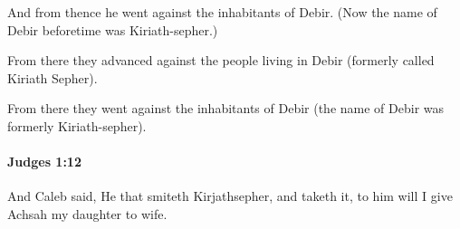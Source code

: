 			\begin{versebox}
					\item[BHS] 
					\item[ASV] And from thence he went against the inhabitants of Debir. (Now the name of Debir beforetime was Kiriath-sepher.)
					\item[NIV] From there they advanced against the people living in Debir (formerly called Kiriath Sepher).
					\item[NRSV] From there they went against the inhabitants of Debir (the name of Debir was formerly Kiriath-sepher).
			\end{versebox}

		\paragraph{Judges 1:12} %
			\label{JUDGES-1-12}

			And Caleb said, He that smiteth Kirjathsepher, and taketh it, to him will I give Achsah my daughter to wife.

